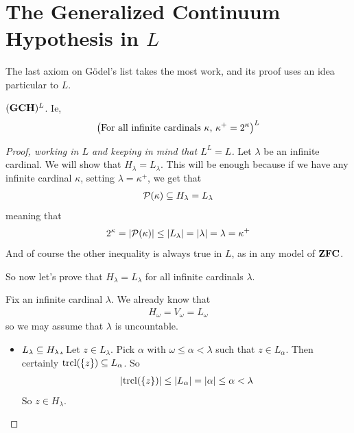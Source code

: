 \section{The Generalized Continuum Hypothesis in $L$}

The last axiom on Gödel's list takes the most work, and its proof uses an idea particular to $L$.

\begin{boxtheorem}[Working in $L$] \label{Ch4:Thm:GCH_In_L}
    $(\mathbf{GCH})^L$. Ie,
    \begin{align*}
        \left( \text{For all infinite cardinals $\kappa$, } \kappa^+ = 2^{\kappa} \right)^L
    \end{align*}
\end{boxtheorem}
\begin{proof}[Proof, working in $L$ and keeping in mind that $L^L = L$]
    Let $\lambda$ be an infinite cardinal. We will show that $H_{\lambda} = L_{\lambda}$. This will be enough because if we have any infinite cardinal $\kappa$, setting $\lambda = \kappa^+$, we get that
    \begin{align*}
        \mathcal{P}(\kappa) \subseteq H_{\lambda} = L_{\lambda}
    \end{align*}
    meaning that
    \begin{align*}
        2^{\kappa} = \left\lvert \mathcal{P}(\kappa) \right\rvert \leq \left\lvert L_{\lambda} \right\rvert = \left\lvert \lambda \right\rvert = \lambda = \kappa^+
    \end{align*}
    And of course the other inequality is always true in $L$, as in any model of $\mathbf{ZFC}$.

    So now let's prove that $H_{\lambda} = L_{\lambda}$ for all infinite cardinals $\lambda$.

    Fix an infinite cardinal $\lambda$. We already know that
    \begin{align*}
        H_{\omega} = V_{\omega} = L_{\omega}
    \end{align*}
    so we may assume that $\lambda$ is uncountable.
    \begin{itemize}
        \item \underline{$L_{\lambda} \subseteq H_{\lambda}$.} Let $z \in L_{\lambda}$. Pick $\alpha$ with $\omega \leq \alpha < \lambda$ such that $z \in L_{\alpha}$. Then certainly $\operatorname{trcl}\!\left( \left\{ z \right\} \right) \subseteq L_{\alpha}$. So
        \begin{align*}
            \left\lvert \operatorname{trcl}\!\left( \left\{ z \right\} \right) \right\rvert \leq \left\lvert L_{\alpha} \right\rvert = \left\lvert \alpha \right\rvert\leq \alpha < \lambda
        \end{align*}
        So $z \in H_{\lambda}$.


\end{itemize}
\end{proof}
